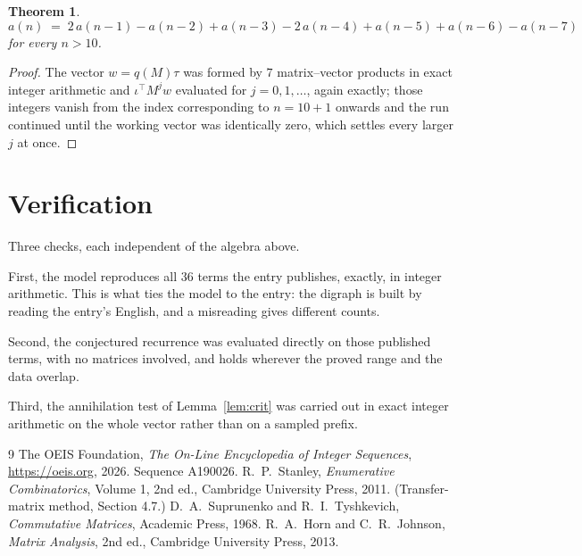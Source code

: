 \documentclass[11pt,a4paper]{article}
\theoremstyle{plain}
\newtheorem{theorem}{Theorem}
\theoremstyle{definition}
\begin{document}
\begin{theorem}
\[
a(n)\;=\;2\,a(n-1) - a(n-2) + a(n-3) - 2\,a(n-4) + a(n-5) + a(n-6) - a(n-7)
\]
for every $n>10$.
\end{theorem}

\begin{proof}
The vector $w=q(M)\tau$ was formed by $7$ matrix--vector products in exact integer
arithmetic and $\iota^{\!\top}M^{j}w$ evaluated for $j=0,1,\dots$, again exactly; those
integers vanish from the index corresponding to $n=10+1$ onwards and the run continued
until the working vector was identically zero, which settles every larger $j$ at once.
\end{proof}

\section{Verification}

Three checks, each independent of the algebra above.

First, the model reproduces all $36$ terms the entry publishes, exactly, in integer
arithmetic. This is what ties the model to the entry: the digraph is built by reading the
entry's English, and a misreading gives different counts.

Second, the conjectured recurrence was evaluated directly on those published terms, with no
matrices involved, and holds wherever the proved range and the data overlap.

Third, the annihilation test of Lemma~\ref{lem:crit} was carried out in exact integer
arithmetic on the whole vector rather than on a sampled prefix.

\begin{thebibliography}{9}
 The OEIS Foundation, \emph{The On-Line Encyclopedia of Integer
Sequences}, \url{https://oeis.org}, 2026. Sequence A190026.
 R.~P.~Stanley, \emph{Enumerative Combinatorics}, Volume 1, 2nd ed.,
Cambridge University Press, 2011. (Transfer-matrix method, Section 4.7.)
 D.~A.~Suprunenko and R.~I.~Tyshkevich, \emph{Commutative Matrices},
Academic Press, 1968.
 R.~A.~Horn and C.~R.~Johnson, \emph{Matrix Analysis}, 2nd ed., Cambridge
University Press, 2013.
\end{thebibliography}
\end{document}
